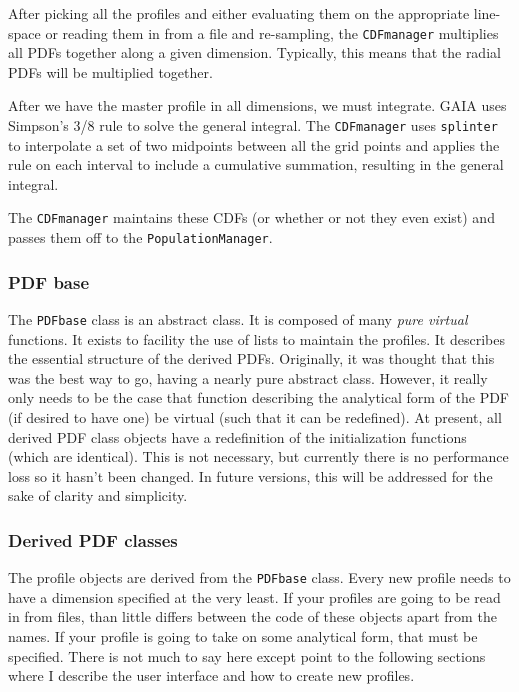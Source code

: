 \documentclass[10pt,a4paper,final]{article}
\numberwithin{equation}{section}
\begin{document}
\begin{multicols}{2}[]
				After picking all the profiles and either evaluating them on the appropriate line-space or
				reading them in from a file and re-sampling, the \texttt{CDFmanager} multiplies all PDFs
				together along a given dimension. Typically, this means that the radial PDFs will be multiplied
				together.

				After we have the master profile in all dimensions, we must integrate. GAIA uses Simpson's
				3/8 rule to solve the general integral. The \texttt{CDFmanager} uses \texttt{splinter} to
				interpolate a set of two midpoints between all the grid points and applies the rule on
				each interval to include a cumulative summation, resulting in the general integral.

				The \texttt{CDFmanager} maintains these CDFs (or whether or not they even exist) and passes
				them off to the \texttt{PopulationManager}.

			\subsubsection{PDF base}
				
				The \texttt{PDFbase} class is an abstract class. It is composed of many \textit{pure virtual}
				functions. It exists to facility the use of lists to maintain the profiles. It describes
				the essential structure of the derived PDFs. Originally, it was thought that this was the
				best way to go, having a nearly pure abstract class. However, it really only needs to be
				the case that function describing the analytical form of the PDF (if desired to have one)
				be virtual (such that it can be redefined). At present, all derived PDF class objects have
				a redefinition of the initialization functions (which are identical). This is not necessary,
				but currently there is no performance loss so it hasn't been changed. In future versions,
				this will be addressed for the sake of clarity and simplicity.

			\subsubsection{Derived PDF classes}
				
				The profile objects are derived  from the \texttt{PDFbase} class. Every new profile needs
				to have a dimension specified at the very least. If your profiles are going to be read in 
				from files, than little differs between the code of these objects apart from the names.
				If your profile is going to take on some analytical form, that must be specified. There
				is not much to say here except point to the following sections where I describe the user
				interface and how to create new profiles.


\end{multicols}
\end{document}
